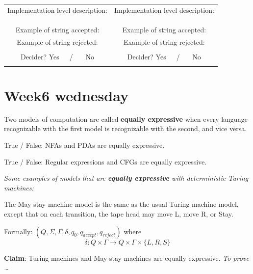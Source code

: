\documentclass[12pt, oneside]{article}
\begin{document}
\begin{center}
\begin{tabular}{|c|c|}
  Implementation  level description:  \phantom{\hspace{1in}} &Implementation  level description:  \phantom{\hspace{1in}} \\
  &\\
  &\\
  &\\
  Example of string accepted: \phantom{\hspace{1.5in}}& Example of string accepted: \phantom{\hspace{1.5in}}\\
  Example of string rejected: \phantom{\hspace{1.5in}}& Example of string  rejected: \phantom{\hspace{1.5in}}\\
  &\\
  Decider? Yes~~~/ ~~~No
  &Decider? Yes~~~/ ~~~No\\
  & \\
  
  \hline
  \end{tabular}
  \end{center} \vfill
\section*{Week6 wednesday}


Two models of computation are called {\bf equally expressive} when 
every language recognizable with the first model is recognizable with the second, and vice versa.

True / False: NFAs and PDAs are equally expressive.

True / False: Regular expressions and CFGs are equally expressive.


\begin{center}
{\large \it  Some examples of models that are {\bf equally expressive} with deterministic Turing machines: }
\end{center}

The May-stay machine model is the same as the usual Turing machine model,  except that
on each transition, the tape head may move L, move R, or Stay. 

Formally: $(Q, \Sigma, \Gamma, \delta, q_0, q_{accept}, q_{reject})$ where 
\[
  \delta: Q \times \Gamma \to Q \times \Gamma \times \{L, R, S\}
\]

{\bf Claim}: Turing machines and May-stay machines are equally expressive. {\it To prove \ldots}
\end{document}
